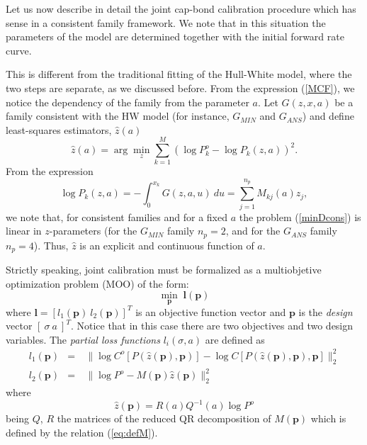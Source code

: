     Let us now describe in detail the joint cap-bond calibration procedure which
    has sense in a consistent family framework. We note that in this situation the
    parameters of the model are determined together with the initial forward
    rate curve. %

This is different from the traditional fitting of the Hull-White model, where the two steps are separate, as we discussed before. From the expression (\ref{MCF}), %
we notice the dependency of the family  from the parameter $a$. Let
$G(z,x,a)$ be a family consistent with the HW model (for instance,
$G_{MIN}$ and $G_{ANS}$) and define least-squares estimators, $\hat{z}(a)$
\begin{equation}
\label{minDcons}
\hat{z}(a)=\arg \underset{z}{\min} \sum_{k=1}^M(\log P^o_k-\log P_k(z,a))^2. 
\end{equation}
From the expression 
\begin{equation}
\label{eq:defM}
\log  P_k(z,a)=-\int_0^{x_k} G(z,a,u)\:du=\sum_{j=1}^{n_p} M_{kj}(a) z_j,
\end{equation}
we note that, for consistent families and for a fixed $a$ the problem
(\ref{minDcons}) is linear in $z$-parameters (for the $G_{MIN}$ family
$n_p=2$, and for the $G_{ANS}$ family $n_p=4$). Thus, $\hat{z}$ is an
explicit and continuous function of $a$. 

Strictly speaking, joint calibration must be formalized as a
multiobjetive optimization problem (MOO) of the form:   
\begin{equation}
\underset{\boldsymbol p}{\min}\;\boldsymbol{l}(\boldsymbol p)
\end{equation}
where
$\boldsymbol{l}=[l_1(\boldsymbol p)\:l_2(\boldsymbol p)]^T$ is
an objective function vector and $\boldsymbol p$ is the {\sl
  design} vector $[\:\sigma\:a\:]^T$. Notice that in this case there
are two objectives and two design variables. The {\sl partial loss
  functions} $l_i(\sigma,a)$ are defined as 
\begin{equation}
\begin{array}{rcl}
l_1(\boldsymbol p) & = & ~\|\log C^o\left[P(\hat{z}(\boldsymbol
  p),\boldsymbol p)\right]-\log C\left[P(\hat{z}(\boldsymbol
  p),\boldsymbol
  p),\boldsymbol p\right]\|^2_2  \\ \nonumber 
l_2(\boldsymbol p) & = & ~\|\log
P^o-M(\boldsymbol p)\hat{z}(\boldsymbol p)\|^2_2
\end{array}
\end{equation}
where 
\begin{equation}
\hat{z}(\boldsymbol p)=R(a)Q^{-1}(a)\log P^o
\end{equation}
being $Q$, $R$ the matrices of the reduced QR decomposition of $M(\boldsymbol p)$
which is defined by the relation (\ref{eq:defM}).

